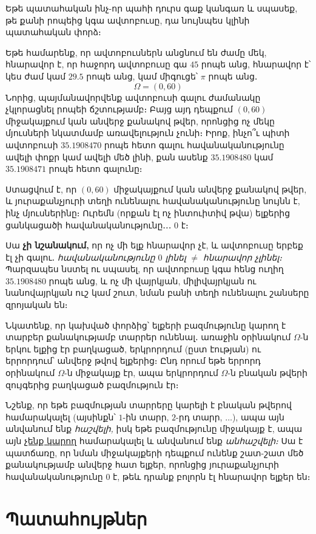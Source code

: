 \begin{example}
Եթե պատահական ինչ-որ պահի դուրս գաք կանգառ և սպասեք, թե քանի րոպեից կգա ավտոբուսը, դա նույնպես կլինի պատահական փորձ։ 

Եթե համարենք, որ ավտոբուսներն անցնում են ժամը մեկ, հնարավոր է, որ հաջորդ ավտոբուսը գա $45$ րոպե անց, հնարավոր է՝ կես ժամ կամ $29.5$ րոպե անց, կամ միգուցե՝ $\pi$ րոպե անց․
\[
\Omega = (0, 60)
\]
Նորից, պայմանավորվենք ավտոբուսի գալու ժամանակը չկլորացնել րոպեի ճշտությամբ։ Բայց այդ դեպքում $(0, 60)$ միջակայքում կան անվերջ քանակով թվեր, որոնցից ոչ մեկը մյուսների նկատմամբ առավելություն չունի։ Իրոք, ինչո՞ւ պիտի ավտոբուսի $35.1908470$ րոպե հետո գալու հավանականությունը ավելի փոքր կամ ավելի մեծ լինի, քան ասենք $35.1908480$ կամ $35.1908471$ րոպե հետո գալունը։ 

Ստացվում է, որ $(0, 60)$ միջակայքում կան անվերջ քանակով թվեր, և յուրաքանչյուրի տեղի ունենալու հավանականությունը նույնն է, ինչ մյուսներինը։ Ուրեմն (որքան էլ ոչ ինտուիտիվ թվա) ելքերից ցանկացածի հավանականությունը․․․ $0$ է։ 

Սա \textbf{չի նշանակում,} որ ոչ մի ելք հնարավոր չէ, և ավտոբուսը երբեք էլ չի գալու․ \textit{հավանականությունը $0$ լինել} $\ne$ \textit{հնարավոր չլինել։} Պարզապես նստել ու սպասել, որ ավտոբուսը կգա հենց ուղիղ $35.1908480$ րոպե անց, և ոչ մի վայրկյան, միլիվայրկյան ու նանովայրկյան ուշ կամ շուտ, նման բանի տեղի ունենալու շանսերը զրոյական են։
\end{example}

Նկատենք, որ կախված փորձից՝ ելքերի բազմությունը կարող է տարբեր քանակությամբ տարրեր ունենալ․ առաջին օրինակում $\Omega$-ն երկու ելքից էր բաղկացած, երկրորդում (ըստ էության) ու երրորդում՝ անվերջ թվով ելքերից։ Ընդ որում եթե երրորդ օրինակում $\Omega$-ն միջակայք էր, ապա երկրորդում $\Omega$-ն բնական թվերի զույգերից բաղկացած բազմություն էր։ 

Նշենք, որ եթե բազմության տարրերը կարելի է բնական թվերով համարակալել (այսինքն՝ $1$-ին տարր, $2$-րդ տարր, $\dots$), ապա այն անվանում ենք \textit{հաշվելի,} իսկ եթե բազմությունը միջակայք է, ապա այն \href{https://www.youtu.be/nU3fzO94lBw}{չենք կարող} համարակալել և անվանում ենք \textit{անհաշվելի։} Սա է պատճառը, որ նման միջակայքերի դեպքում ունենք շատ-շատ մեծ քանակությամբ անվերջ հատ ելքեր, որոնցից յուրաքանչյուրի հավա\-նականությունը $0$ է, թեև դրանք բոլորն էլ հնարավոր ելքեր են։



\section{Պատահույթներ}

